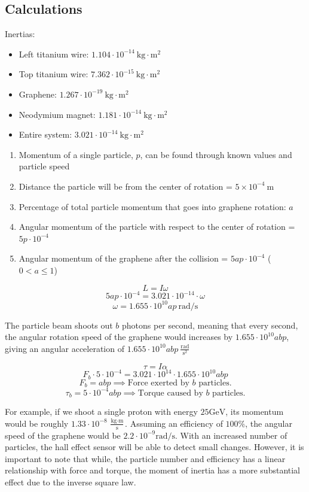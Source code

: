 \documentclass{article}
\begin{document}
    \subsection{Calculations}

    \indent Inertias:
    \begin{itemize}
    \item Left titanium wire: $1.104\cdot10^{-14}\:\text{kg}\cdot\text{m}^2$
    \item Top titanium wire: $7.362\cdot10^{-15}\:\text{kg}\cdot\text{m}^2$
    \item Graphene: $1.267\cdot10^{-19}\:\text{kg}\cdot\text{m}^2$
    \item Neodymium magnet: $1.181\cdot10^{-14}\:\text{kg}\cdot\text{m}^2$
    \item Entire system: $3.021\cdot10^{-14}\:\text{kg}\cdot\text{m}^2$
    \end{itemize}

    \begin{enumerate}
    \item Momentum of a single particle, $p$, can be found through known values and particle speed
    \item Distance the particle will be from the center of rotation = $5\times10^{-4} \:\text{m}$
    \item Percentage of total particle momentum that goes into graphene rotation: $a$
    \item Angular momentum of the particle with respect to the center of rotation = $5p\cdot10^{-4}$
    \item Angular momentum of the graphene after the collision = $5ap\cdot10^{-4}$ ($0 < a \le 1$)
    \end{enumerate}

    $$L = I\omega$$
    $$5ap\cdot10^{-4}=3.021\cdot10^{-14}\cdot\omega$$
    $$\omega = 1.655\cdot10^{10}ap\: \text{rad/s}$$

    The particle beam shoots out $b$ photons per second, meaning that every second, the angular rotation speed of the graphene would increases by $1.655\cdot10^{10} abp$, giving an angular acceleration of $1.655\cdot10^{10}abp\: \frac{\text{rad}}{\text{s}^2}$

    $$\tau=I\alpha$$
    $$F_b\cdot5\cdot10^{-4}=3.021\cdot10^{14}\cdot1.655\cdot10^{10}abp$$
    $$F_b=abp\implies\text{Force exerted by }b\text{ particles.}$$
    $$\tau_b=5\cdot10^{-4}abp\implies\text{Torque caused by }b\text{ particles.}$$

For example, if we shoot a single proton with energy $25\text{GeV}$, its momentum would be roughly $1.33\cdot10^{-8}\:\frac{\text{kg}\cdot\text{m}}{\text{s}}$. Assuming an efficiency of $100\%$, the angular speed of the graphene would be $2.2\cdot10^{-9} \text{rad/s}$. With an increased number of particles, the hall effect sensor will be able to detect small changes. However, it is important to note that while, the particle number and efficiency has a linear relationship with force and torque, the moment of inertia has a more substantial effect due to the inverse square law.
\end{document}
